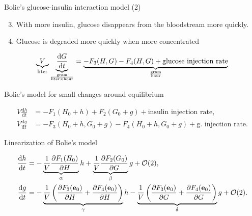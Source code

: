 \documentclass{beamer}
\providecommand{\m}[1]{\ensuremath{\mathrm{#1}}}
\providecommand{\p}[1]{\ensuremath{\partial #1}}
\begin{document}
\begin{frame}{Bolie's glucose-insulin interaction model (2)}

\begin{enumerate}
\setcounter{enumi}{2}
	\item
	With more insulin, glucose disappears from the bloodstream more quickly. 
	\item
	Glucose is degraded more quickly when more concentrated
\end{enumerate}

\begin{align*}
\underbrace{V}_%
{\text{liter}}%
%
\underbrace{\frac{\m{d} G}{\m{d} t}}_%
{\frac{\text{gram}}{\text{liter} \times\text{hour}}}
=%
\underbrace{-F_3(H,G)-F_4(H,G) +\text{glucose injection rate}}%
_{\frac{\text{gram}}{\text{hour}}}
\end{align*}


\end{frame}

\begin{frame}{Bolie's model for small changes around equilibrium}

\begin{equation*}
\begin{aligned}
V\frac{\m{d}h}{\m{d}t}&=-F_1(H_0+h)+F_2(G_0+g)+ \text{insulin injection rate},\\
V\frac{\m{d}g}{\m{d}t}&=-F_3(H_0+h,G_0+g)-F_4(H_0+h,G_0+g)+ \text{g. injection rate}.
\end{aligned}
\end{equation*}
\end{frame}

\begin{frame}{Linearization of Bolie's model}


\begin{align*}
\frac{\m{d}h}{\m{d}t}&=-\underbrace{%
		\frac{1}{V}\frac{\p F_1(H_0)}{\p H}}_{\alpha}h+%
%
\underbrace{%
		\frac{1}{V}\frac{\p F_2(G_0)}{\p G}}_{\beta}g+\mathcal{O}(2), \\%
%
\frac{\m{d}g}{\m{d}t}&=%
%
-\underbrace{%
\frac{1}{V}\left(\frac{\p F_3(\mathbf{e}_0)}{\p H}+\frac{\p F_4(\mathbf{e}_0)}{\p H}\right)}_{\gamma}h%
-\underbrace{%
\frac{1}{V}\left(\frac{\p F_3(\mathbf{e}_0)}{\p G}+\frac{\p F_4(\mathbf{e}_0)}{\p G}\right)}_{\delta} g+\mathcal{O}(2).
\end{align*}


\end{frame}
\end{document}
